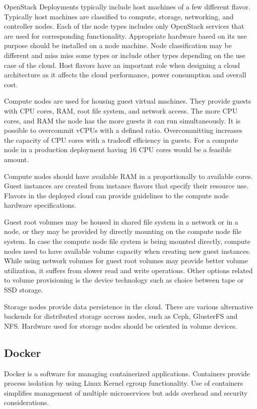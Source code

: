 OpenStack Deployments typically include host machines of a few different
flavor. Typically host machines are classified to compute, storage, networking,
and controller nodes. Each of the node types includes only OpenStack services
that are used for corresponding functionality. Appropriate hardware based on
its use purpose should be installed on a node machine. Node  classification may
be different and miss miss some types or include other types depending on the
use case of the cloud. Host flavors have an important role when designing a
cloud architecture as it affects the cloud performance, power consumption and
overall cost.

Compute nodes are used for housing guest virtual machines. They provide guests
with CPU cores, RAM, root file system, and network access. The more CPU cores,
and RAM the node has the more guests it can run simultaneously. It is possible
to overcommit vCPUs with a defined ratio. Overcommitting increases the capacity
of CPU cores with a tradeoff efficiency in guests. For a compute node in a
production deployment having 16 CPU cores would be a feasible amount.

Compute nodes should have available RAM in a proportionally to available cores.
Guest instances are created from instance flavors that specify their resource
use. Flavors in the deployed cloud can provide guidelines to the compute node
hardware specifications.

Guest root volumes may be housed in shared file system in a network or in a
node, or they may be provided by directly mounting on the compute node file
system. In case the compute node file system is being mounted directly, compute
nodes need to have available volume capacity when creating new guest instances.
While using network volumes for guest root volumes may provide better volume
utilization, it suffers from slower read and write operations. Other options
related to volume provisioning is the device technology such as choice between
tape or SSD storage.

Storage nodes provide data persistence in the cloud. There are various
alternative backends for distributed storage accross nodes, such as Ceph,
GlusterFS and NFS. Hardware used for storage nodes should be oriented in volume
devices.

\subsection{Docker}

Docker \cite{docker} is a software for managing containerized applications.
Containers provide process isolation by using Linux Kernel cgroup \cite{cgroup}
functionality. Use of containers simplifies management of multiple
microservices but adds overhead and security considerations.

